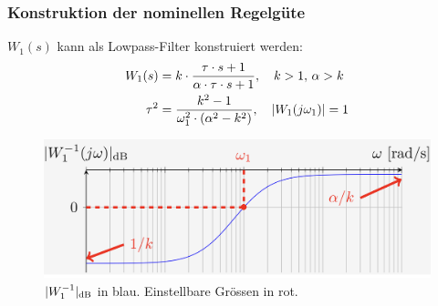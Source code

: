     \subsubsection{Konstruktion der nominellen Regelgüte}
        $W_1(s)$ kann als Lowpass-Filter konstruiert werden:
        \begin{align*}
            W_1(s) &= k\cdot\frac{\tau\cdot s + 1}{\alpha\cdot\tau\cdot s + 1}, \quad k > 1,\, \alpha > k\\
            \tau^2 &= \frac{k^2 - 1}{\omega_1^2\cdot(\alpha^2-k^2)}, \quad |W_1(j\omega_1)| = 1
        \end{align*}
        
        \begin{figure}[H]
            \centering
            \includegraphics[width = 0.8\linewidth]{images/03/W_1.jpeg}
            \caption{$|W_1^{-1}|_\textnormal{dB}$ in blau. Einstellbare Grössen in rot.}
        \end{figure}

